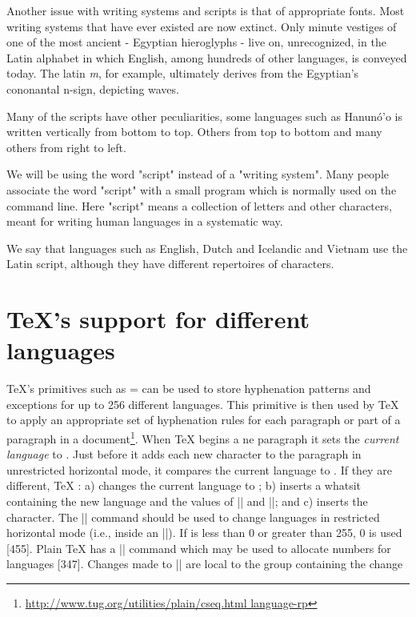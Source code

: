Another issue with writing systems and scripts is that of appropriate fonts. Most writing systems that have ever existed are now extinct. Only minute vestiges of one of the most ancient - Egyptian hieroglyphs - live on, unrecognized, in the Latin alphabet in which English, among hundreds of other languages, is conveyed today. The latin \textit{m}, for example, ultimately derives from the Egyptian's cononantal n-sign, depicting waves.

Many of the scripts have other peculiarities, some languages such as Hanunó'o is written vertically from bottom to top. Others from top to bottom and many others from right to left. 

We will be using the word "script" instead of a "writing system". Many people associate the word "script" with a small program which is normally used on the command line. Here "script" means a collection of letters and other characters, meant for writing human languages in a systematic way. 

We say that languages such as English, Dutch and Icelandic and Vietnam use the Latin script, although they have different repertoires of characters.



\section{TeX's support for different languages}

TeX's primitives such as \cmd{\language}= can be used to store hyphenation patterns and exceptions for up to 256 different languages. This primitive is then used by TeX to apply an appropriate set of hyphenation rules for each paragraph or part of a paragraph in a document\footnote{\url{http://www.tug.org/utilities/plain/cseq.html language-rp}}. When TeX begins a ne paragraph it sets the \emph{current language} to \cmd{\language}. Just before it adds each new character to the paragraph in unrestricted horizontal mode, it compares the current language to \cmd{\language}. If they are different, TeX : a) changes the current language to \cmd{\language}; b) inserts a whatsit containing the new language and the values of |\lefthyphenmin| and |\righthyphenmin|; and c) inserts the character. The |\setlanguage| command should be used to change languages in restricted horizontal mode (i.e., inside an |\hbox|). If  is less than 0 or greater than 255, 0 is used [455]. Plain TeX has a |\newlanguage| command which may be used to allocate numbers for languages [347]. Changes made to |\language| are local to the group containing the change 

